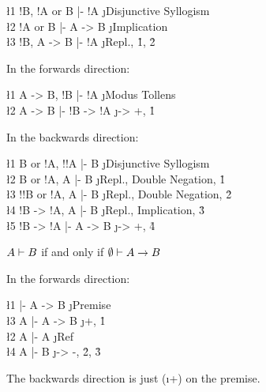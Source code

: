 \documentclass[class=cs245,leqno]{agony}
\begin{document}
\begin{theorem}
\end{theorem}
\begin{prf}
  \begin{deduce}
    \l1 !B, !A or B |- !A     \j {Disjunctive Syllogism} \\
    \l2 !A or B     |- A -> B \j {Implication}           \\
    \l3 !B, A -> B  |- !A     \j {Repl., \r1, \r2}
  \end{deduce}
\end{prf}

\begin{theorem}[Contrapositive]
\end{theorem}
\begin{prf}
  In the forwards direction:
  \begin{deduce}
    \l1 A -> B, !B |- !A       \j {Modus Tollens} \\
    \l2 A -> B     |- !B -> !A \j {-> +, \r1}
  \end{deduce}
  In the backwards direction:
  \begin{deduce}
    \l1 B or !A, !!A |- B      \j {Disjunctive Syllogism}       \\
    \l2 B or !A, A   |- B      \j {Repl., Double Negation, \r1} \\
    \l3 !!B or !A, A |- B      \j {Repl., Double Negation, \r2} \\
    \l4 !B -> !A, A  |- B      \j {Repl., Implication, \r3}     \\
    \l5 !B -> !A     |- A -> B \j {-> +, \r4}
  \end{deduce}
\end{prf}

\begin{theorem}[Affirmation]
  $A \vdash B$ if and only if $\emptyset \vdash A \to B$
\end{theorem}
\begin{prf}
  In the forwards direction:
  \begin{deduce}
    \l1 \0 |- A -> B \j {Premise}        \\
    \l3 A  |- A -> B \j {+, \r1}         \\
    \l2 A  |- A      \j {Ref}            \\
    \l4 A  |- B      \j {-> -, \r2, \r3}
  \end{deduce}
  The backwards direction is just (\i +) on the premise.
\end{prf}
\end{document}
